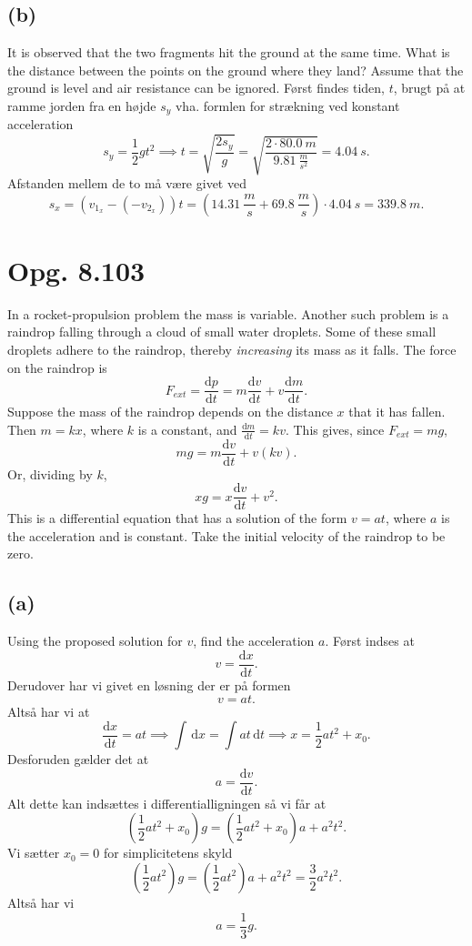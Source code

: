\documentclass[12pt]{article}
\begin{document}
\subsection*{(b)}
It is observed that the two fragments hit the ground at the same time. What is the distance between the points on the ground where they land? Assume that the ground is level and air resistance can be ignored.
\bigbreak
Først findes tiden, $t$, brugt på at ramme jorden fra en højde $s_y$ vha. formlen for strækning ved konstant acceleration
\[
  s_y = \frac{1}{2}gt^2 \implies t = \sqrt{\frac{2s_y}{g}} = \sqrt{\frac{2\cdot \qty{80,0}{m}}{\qty{9,81}{\frac{m}{s^2}}}} = \qty{4,04}{s} 
.\] 
Afstanden mellem de to må være givet ved
\[
s_x = (v_{1_x} - (-v_{2_x}))t = \left( \qty{14,31}{\frac{m}{s}} + \qty{69,8}{\frac{m}{s}} \right)\cdot \qty{4,04}{s} = \qty{339,8}{m}
.\] 


\section*{Opg. 8.103}
In a rocket-propulsion problem the mass is variable. Another such problem is a raindrop falling through a cloud of small water droplets. Some of these small droplets adhere to the raindrop, thereby \textit{increasing} its mass as it falls. The force on the raindrop is
\[
F_{ext} = \frac{\mathrm{d}p}{\mathrm{d}t} = m \frac{\mathrm{d}v}{\mathrm{d}t} + v \frac{\mathrm{d}m}{\mathrm{d}t} 
.\]
Suppose the mass of the raindrop depends on the distance $x$ that it has fallen. Then $m = kx$, where $k$ is a constant, and $ \frac{\mathrm{d}m}{\mathrm{d}t} = kv$. This gives, since $F_{ext} = mg$,
\[
mg = m \frac{\mathrm{d}v}{\mathrm{d}t} + v(kv)
.\] 
Or, dividing by $k$,
 \[
xg = x \frac{\mathrm{d}v}{\mathrm{d}t} + v^2
.\] 
This is a differential equation that has a solution of the form $v = at$, where $a$ is the acceleration and is constant. Take the initial velocity of the raindrop to be zero.

\subsection*{(a)}
Using the proposed solution for $v$, find the acceleration $a$.
\bigbreak
Først indses at
\[
v = \frac{\mathrm{d}x}{\mathrm{d}t} 
.\] 
Derudover har vi givet en løsning der er på formen
\[
v = at
.\] 
Altså har vi at
\[
\frac{\mathrm{d}x}{\mathrm{d}t} = at \implies \int \, \mathrm{d}x = \int at \, \mathrm{d}t \implies x = \frac{1}{2}at^2 + x_0
.\] 
Desforuden gælder det at
\[
a = \frac{\mathrm{d}v}{\mathrm{d}t} 
.\] 
Alt dette kan indsættes i differentialligningen så vi får at
\[
  \left( \frac{1}{2}at^2 + x_0 \right)g = \left( \frac{1}{2}at^2 + x_0\right)a + a^2t^2
.\]
Vi sætter $x_0 = 0$ for simplicitetens skyld
 \[
   \left( \frac{1}{2}at^2 \right) g = \left( \frac{1}{2}at^2 \right) a + a^2t^2 = \frac{3}{2}a^2t^2
.\]
Altså har vi
\[
a = \frac{1}{3}g
.\] 
\end{document}
